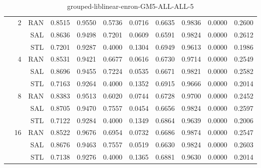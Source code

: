 \begin{center}
\begin{table}[htbp]
\begin{tabular}{ | r | r | r | r | r | r | r | r | r | r | r |}
 & \multirow{3}{*}{2} & RAN & 0.8515 & 0.9550 & 0.5736 & 0.0716 & 0.6635 & 0.9836 & 0.0000 & 0.2600\\ \cline{3-11}
 &   & SAL & 0.8636 & 0.9498 & 0.7201 & 0.0609 & 0.6591 & 0.9824 & 0.0000 & 0.2612\\ \cline{3-11}
 &   & STL & 0.7201 & 0.9287 & 0.4000 & 0.1304 & 0.6949 & 0.9613 & 0.0000 & 0.1986\\ \cline{2-11}
 & \multirow{3}{*}{4} & RAN & 0.8531 & 0.9421 & 0.6677 & 0.0616 & 0.6730 & 0.9714 & 0.0000 & 0.2549\\ \cline{3-11}
 &   & SAL & 0.8696 & 0.9455 & 0.7224 & 0.0535 & 0.6671 & 0.9821 & 0.0000 & 0.2582\\ \cline{3-11}
 &   & STL & 0.7163 & 0.9264 & 0.4000 & 0.1352 & 0.6915 & 0.9666 & 0.0000 & 0.2014\\ \cline{2-11}
 & \multirow{3}{*}{8} & RAN & 0.8383 & 0.9513 & 0.6020 & 0.0744 & 0.6728 & 0.9700 & 0.0000 & 0.2452\\ \cline{3-11}
 &   & SAL & 0.8705 & 0.9470 & 0.7557 & 0.0454 & 0.6656 & 0.9824 & 0.0000 & 0.2597\\ \cline{3-11}
 &   & STL & 0.7122 & 0.9284 & 0.4000 & 0.1349 & 0.6864 & 0.9639 & 0.0000 & 0.2006\\ \cline{2-11}
 & \multirow{3}{*}{16} & RAN & 0.8522 & 0.9676 & 0.6954 & 0.0732 & 0.6686 & 0.9874 & 0.0000 & 0.2547\\ \cline{3-11}
 &   & SAL & 0.8676 & 0.9463 & 0.7557 & 0.0519 & 0.6630 & 0.9824 & 0.0000 & 0.2603\\ \cline{3-11}
 &   & STL & 0.7138 & 0.9276 & 0.4000 & 0.1365 & 0.6881 & 0.9630 & 0.0000 & 0.2014\\ \cline{2-11}
\hline
\end{tabular}
\caption{grouped-liblinear-enron-GM5-ALL-ALL-5}
\end{table}
\end{center}


